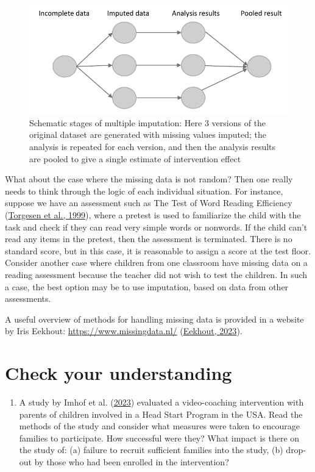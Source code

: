 \documentclass{krantz}
\providecommand{\tightlist}{%
\setlength{\itemsep}{0pt}\setlength{\parskip}{0pt}}
\begin{document}
\begin{center}
\begin{figure}
\includegraphics[width=0.75\linewidth]{images_bw/mice_fig} \caption{Schematic stages of multiple imputation: Here 3 versions of the original dataset are generated with missing values imputed; the analysis is repeated for each version, and then the analysis results are pooled to give a single estimate of intervention effect}\label{fig:micefig}
\end{figure}
\end{center}

What about the case where the missing data is not random? Then one really needs to think through the logic of each individual situation. For instance, suppose we have an assessment such as The Test of Word Reading Efficiency (\protect\hyperlink{ref-torgesen1999}{Torgesen et al., 1999}), where a pretest is used to familiarize the child with the task and check if they can read very simple words or nonwords. If the child can't read any items in the pretest, then the assessment is terminated. There is no standard score, but in this case, it is reasonable to assign a score at the test floor. Consider another case where children from one classroom have missing data on a reading assessment because the teacher did not wish to test the children. In such a case, the best option may be to use imputation, based on data from other assessments.

A useful overview of methods for handling missing data is provided in a website by Iris Eekhout: \url{https://www.missingdata.nl/} (\protect\hyperlink{ref-eekhout2023}{Eekhout, 2023}).

\hypertarget{check-your-understanding-8}{%
\section{Check your understanding}\label{check-your-understanding-8}}

\begin{enumerate}
\def\labelenumi{\arabic{enumi}.}
\tightlist
\item
  A study by Imhof et al. (\protect\hyperlink{ref-imhof2023}{2023}) evaluated a video-coaching intervention with parents of children involved in a Head Start Program in the USA. Read the methods of the study and consider what measures were taken to encourage families to participate. How successful were they? What impact is there on the study of: (a) failure to recruit sufficient families into the study, (b) drop-out by those who had been enrolled in the intervention?
\end{enumerate}
\end{document}
